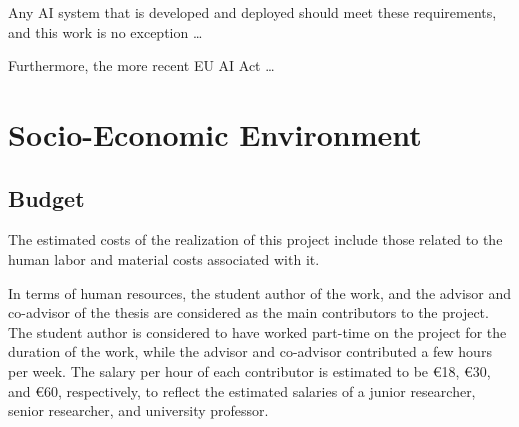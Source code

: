 \documentclass[../main.tex]{subfiles}
\begin{document}
Any AI system that is developed and deployed should meet these requirements, and this work is no exception \dots

Furthermore, the more recent EU AI Act \cite{eu_aiact_2023}\dots



\chapter*{Socio-Economic Environment} \label{chap:socioeconomic}



\section*{Budget} \label{budget}
\vspace*{-0.05cm}

The estimated costs of the realization of this project include those related to the human labor and material costs associated with it.

In terms of human resources, the student author of the work, and the advisor and co-advisor of the thesis are considered as the main contributors to the project. The student author is considered to have worked part-time on the project for the duration of the work, while the advisor and co-advisor contributed a few hours per week. The salary per hour of each contributor is estimated to be €18, €30, and €60, respectively, to reflect the estimated salaries of a junior researcher, senior researcher, and university professor.
\end{document}
